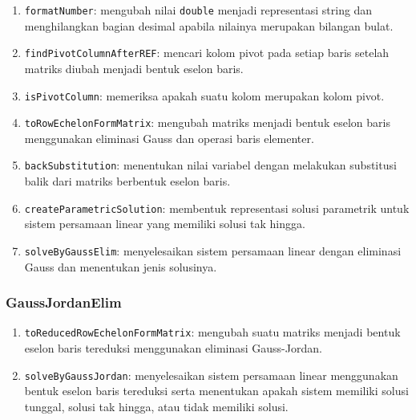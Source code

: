 \documentclass{article}
\begin{document}
\begin{enumerate}

    \item{\texttt{formatNumber}: mengubah nilai \texttt{double} menjadi representasi string dan menghilangkan bagian desimal apabila nilainya merupakan bilangan bulat.}

    \item{\texttt{findPivotColumnAfterREF}: mencari kolom pivot pada setiap baris setelah matriks diubah menjadi bentuk eselon baris.}

    \item{\texttt{isPivotColumn}: memeriksa apakah suatu kolom merupakan kolom pivot.}

    \item{\texttt{toRowEchelonFormMatrix}: mengubah matriks menjadi bentuk eselon baris menggunakan eliminasi Gauss dan operasi baris elementer.}

    \item{\texttt{backSubstitution}: menentukan nilai variabel dengan melakukan substitusi balik dari matriks berbentuk eselon baris.}

    \item{\texttt{createParametricSolution}: membentuk representasi solusi parametrik untuk sistem persamaan linear yang memiliki solusi tak hingga.}

    \item{\texttt{solveByGaussElim}: menyelesaikan sistem persamaan linear dengan eliminasi Gauss dan menentukan jenis solusinya.}

\end{enumerate}


\subsubsection{GaussJordanElim}


\begin{enumerate}

    \item{\texttt{toReducedRowEchelonFormMatrix}: mengubah suatu matriks menjadi bentuk eselon baris tereduksi menggunakan eliminasi Gauss-Jordan.}

    \item{\texttt{solveByGaussJordan}: menyelesaikan sistem persamaan linear menggunakan bentuk eselon baris tereduksi serta menentukan apakah sistem memiliki solusi tunggal, solusi tak hingga, atau tidak memiliki solusi.}

\end{enumerate}
\end{document}
